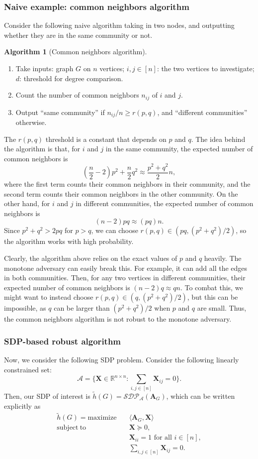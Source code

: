 \documentclass[11pt, titlepage]{article} %
\numberwithin{equation}{section}
\theoremstyle{definition}
\newtheorem{algorithm}{Algorithm}
\numberwithin{theorem}{section}
\numberwithin{lemma}{section}
\numberwithin{corollary}{section}
\numberwithin{proposition}{section}
\numberwithin{definition}{section}
\numberwithin{remark}{section}
\begin{document}
\subsubsection{Naive example: common neighbors algorithm}
Consider the following naive algorithm taking in two nodes, and outputting whether they are in the
same community or not.
\begin{algorithm}[Common neighbors algorithm]
\label{alg:degree}
\leavevmode
\begin{enumerate}
  \item[0.] Take inputs: graph $G$ on $n$ vertices; $i, j \in [n]$: the two vertices to investigate;
  $d$: threshold for degree comparison.
  \item[1.] Count the number of common neighbors $n_{ij}$ of $i$ and $j$.
  \item[2.] Output ``same community'' if $n_{ij}/n \geq r(p,q)$, and ``different communities'' otherwise.
\end{enumerate}
\end{algorithm}
The $r(p,q)$ threshold is a constant that depends on $p$ and $q$. The idea behind the algorithm is
that, for $i$ and $j$ in the same community, the expected number of common neighbors is 
\[
\left(\frac{n}{2} - 2\right) p^2 + \frac{n}{2} q^2 \approx \frac{p^2 + q^2}{2} n,
\]
where the first term counts their common neighbors in their community, and the second term counts
their common neighbors in the other community. On the other hand, for $i$ and $j$ in different
communities, the expected number of common neighbors is
\[
(n-2) pq \approx (pq)n.
\]
Since $p^2 + q^2 > 2pq$ for $p > q$, we can choose $r(p,q) \in (pq, (p^2 + q^2)/2)$, so the algorithm
works with high probability.

Clearly, the algorithm above relies on the exact values of $p$ and $q$ heavily. The monotone adversary
can easily break this. For example, it can add all the edges in both communities. Then, for any two 
vertices in different communities, their expected number of common neighbors is $(n-2) q \approx qn$.
To combat this, we might want to instead choose $r(p,q) \in (q, (p^2 + q^2)/2)$, but this can be 
impossible, as $q$ can be larger than $(p^2 + q^2)/2$ when $p$ and $q$ are small. Thus, the common 
neighbors algorithm is not robust to the monotone adversary.

\subsubsection{SDP-based robust algorithm}
Now, we consider the following SDP problem. Consider the following linearly constrained set:
\[
\mathcal{A} = \{\bm{X} \in \mathbb{R}^{n \times n} : \sum_{i,j \in [n]} \bm{X}_{ij} = 0\}.
\]
Then, our SDP of interest is $\tilde{h}(G) = \mathcal{SDP}_\mathcal{A}(\bm{A}_G)$, which can be 
written explicitly as
\begin{align*}
\tilde{h}(G) = \mathrm{maximize}\quad &\langle \bm{A}_G, \bm{X} \rangle \\
\mathrm{subject}\ \mathrm{to}\quad &\bm{X} \succeq 0,\\
&\bm{X}_{ii} = 1 \text{ for all } i \in [n],\\
&\sum_{i,j \in [n]} \bm{X}_{ij} = 0.
\end{align*}
\end{document}
